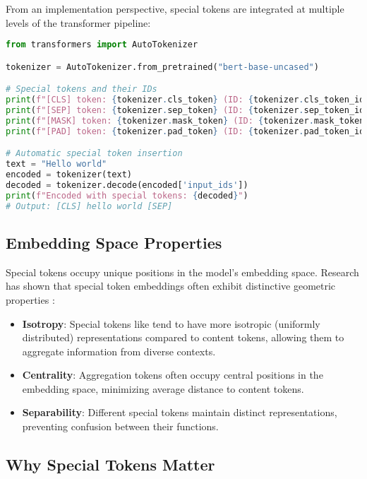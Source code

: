 From an implementation perspective, special tokens are integrated at multiple levels of the transformer pipeline:

\begin{lstlisting}[language=Python, caption=Tokenizer Configuration]
from transformers import AutoTokenizer

tokenizer = AutoTokenizer.from_pretrained("bert-base-uncased")

# Special tokens and their IDs
print(f"[CLS] token: {tokenizer.cls_token} (ID: {tokenizer.cls_token_id})")
print(f"[SEP] token: {tokenizer.sep_token} (ID: {tokenizer.sep_token_id})")
print(f"[MASK] token: {tokenizer.mask_token} (ID: {tokenizer.mask_token_id})")
print(f"[PAD] token: {tokenizer.pad_token} (ID: {tokenizer.pad_token_id})")

# Automatic special token insertion
text = "Hello world"
encoded = tokenizer(text)
decoded = tokenizer.decode(encoded['input_ids'])
print(f"Encoded with special tokens: {decoded}")
# Output: [CLS] hello world [SEP]
\end{lstlisting}

\subsection{Embedding Space Properties}

Special tokens occupy unique positions in the model's embedding space. Research has shown that special token embeddings often exhibit distinctive geometric properties \citep{clark2019what, rogers2020primer}:

\begin{itemize}
\item \textbf{Isotropy}: Special tokens like \cls{} tend to have more isotropic (uniformly distributed) representations compared to content tokens, allowing them to aggregate information from diverse contexts.

\item \textbf{Centrality}: Aggregation tokens often occupy central positions in the embedding space, minimizing average distance to content tokens.

\item \textbf{Separability}: Different special tokens maintain distinct representations, preventing confusion between their functions.
\end{itemize}

\subsection{Why Special Tokens Matter}

